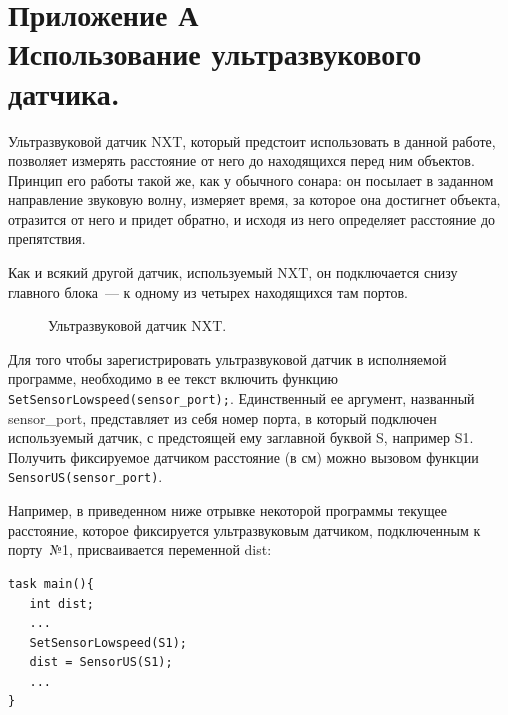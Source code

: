\documentclass[12pt,a4paper,openany]{extarticle}
\begin{document}
\newpage
\section*{Приложение А\\
Использование ультразвукового датчика.}
Ультразвуковой датчик NXT, который предстоит использовать в данной работе, позволяет измерять расстояние от него до находящихся перед ним объектов. 
Принцип его работы такой же, как у обычного сонара: он посылает в заданном направление звуковую волну, измеряет время, за которое она достигнет объекта, отразится от него и придет обратно, и исходя из него определяет расстояние до препятствия.

Как и всякий другой датчик, используемый NXT, он подключается снизу главного блока~--- к одному из четырех находящихся там портов.

	\begin{figure}[h!]
		\caption{Ультразвуковой датчик NXT.}
		\label{ultrasonic_sensor}
	\end{figure}	
	
Для того чтобы зарегистрировать ультразвуковой датчик в исполняемой программе, необходимо в ее текст включить функцию 
\verb|SetSensorLowspeed(sensor_port);|.
Единственный ее аргумент, названный sensor\_port, представляет из себя номер порта, в который подключен используемый датчик, с предстоящей ему заглавной буквой S, например S1.
Получить фиксируемое датчиком расстояние (в см) можно вызовом функции \verb|SensorUS(sensor_port)|.

Например, в приведенном ниже отрывке некоторой программы текущее расстояние, которое фиксируется ультразвуковым датчиком, подключенным к порту~№1, присваивается переменной dist:
\begin{verbatim}
task main(){
   int dist;
   ...
   SetSensorLowspeed(S1);
   dist = SensorUS(S1);
   ...
}
\end{verbatim} 
\end{document}
